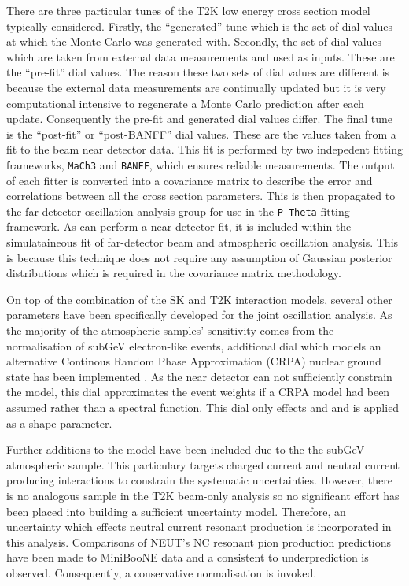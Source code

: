 There are three particular tunes of the T2K low energy cross section model typically considered. Firstly, the ``generated'' tune which is the set of dial values at which the Monte Carlo was generated with. Secondly, the set of dial values which are taken from external data measurements and used as inputs. These are the ``pre-fit'' dial values. The reason these two sets of dial values are different is because the external data measurements are continually updated but it is very computational intensive to regenerate a Monte Carlo prediction after each update. Consequently the pre-fit and generated dial values differ. The final tune is the ``post-fit'' or ``post-BANFF'' dial values. These are the values taken from a fit to the beam near detector data. This fit is performed by two indepedent fitting frameworks, \texttt{MaCh3} and \texttt{BANFF}, which ensures reliable measurements. The output of each fitter is converted into a covariance matrix to describe the error and correlations between all the cross section parameters. This is then propagated to the far-detector oscillation analysis group for use in the \texttt{P-Theta} fitting framework. As  can perform a near detector fit, it is included within the simulataineous fit of far-detector beam and atmospheric oscillation analysis. This is because this technique does not require any assumption of Gaussian posterior distributions which is required in the covariance matrix methodology.

On top of the combination of the SK and T2K interaction models, several other parameters have been specifically developed for the joint oscillation analysis. As the majority of the atmospheric samples' \dcp sensitivity comes from the normalisation of subGeV electron-like events, additional dial which models an alternative Continous Random Phase Approximation (CRPA) nuclear ground state has been implemented \cite{t2k_tn_422}. As the near detector can not sufficiently constrain the model, this dial approximates the event weights if a CRPA model had been assumed rather than a spectral function. This dial only effects  and  and is applied as a shape parameter.

Further additions to the model have been included due to the the subGeV  atmospheric sample. This particulary targets charged current and neutral current  producing interactions to constrain the systematic uncertainties. However, there is no analogous sample in the T2K beam-only analysis so no significant effort has been placed into building a sufficient uncertainty model. Therefore, an uncertainty which effects neutral current resonant  production is incorporated in this analysis. Comparisons of NEUT's NC resonant pion production predictions have been made to MiniBooNE \cite{MB_NC1pi0} data and a consistent  to  underprediction is observed. Consequently, a conservative  normalisation is invoked. 

